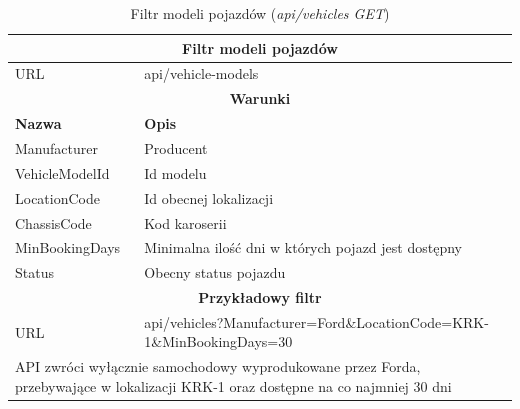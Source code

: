 \documentclass[eng,printmode,openany]{mgr}
\begin{document}
	\begin{table}[H]
		\caption{Filtr modeli pojazdów (\textit{api/vehicles GET})}
		\begin{tabularx}{\textwidth}{|l|X|}
			\hline                                       							
			\multicolumn{2}{|c|}{\textbf{Filtr modeli pojazdów}}  							        	\\ \hline
			URL                 & api/vehicle-models     							             		\\ \hline
			\multicolumn{2}{|c|}{\textbf{Warunki}}     													\\ \hline
			\textbf{Nazwa}      & \textbf{Opis}              											\\ \hline
			Manufacturer        & Producent         													\\ \hline
			VehicleModelId      & Id modelu	        													\\ \hline
			LocationCode        & Id obecnej lokalizacji												\\ \hline
			ChassisCode         & Kod karoserii 	  													\\ \hline
			MinBookingDays      & Minimalna ilość dni w których pojazd jest dostępny					\\ \hline
			Status              & Obecny status pojazdu         										\\ \hline										
			\multicolumn{2}{|c|}{\textbf{Przykładowy filtr}}											\\ \hline
			URL                 & api/vehicles?Manufacturer=Ford\&LocationCode=KRK-1\&MinBookingDays=30	\\ \hline
			\multicolumn{2}{|X|}{API zwróci wyłącznie samochodowy wyprodukowane przez Forda, przebywające w lokalizacji KRK-1 oraz dostępne na co najmniej 30 dni}		\\ \hline
		\end{tabularx}
	\end{table}
	
\end{document}

